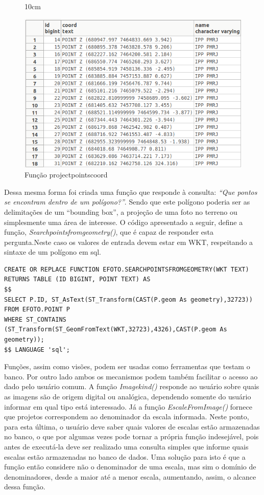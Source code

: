 \begin{figure}[!ht]{10cm}
  \caption{Função projectpointscoord} \label{fun1}
  \centering
  \includegraphics[width=1\hsize]{figuras/fun_ppr.png}
\end{figure}

Dessa mesma forma foi criada uma função que responde à consulta: \textit{``Que pontos se encontram dentro de um polígono?''}. Sendo que este polígono poderia ser as delimitações de um ``bounding box'', a projeção de uma foto no terreno ou simplesmente uma área de interesse. O código apresentado a seguir, define a função, \textit{Searchpointsfromgeometry()}, que é capaz de responder esta pergunta.Neste caso os valores de entrada devem estar em WKT, respeitando a sintaxe de um polígono em sql.

\begin{lstlisting}
CREATE OR REPLACE FUNCTION EFOTO.SEARCHPOINTSFROMGEOMETRY(WKT TEXT)
RETURNS TABLE (ID BIGINT, POINT TEXT) AS
$$
SELECT P.ID, ST_AsText(ST_Transform(CAST(P.geom As geometry),32723))
FROM EFOTO.POINT P
WHERE ST_CONTAINS (ST_Transform(ST_GeomFromText(WKT,32723),4326),CAST(P.geom As geometry));
$$ LANGUAGE 'sql';
\end{lstlisting}

Funções, assim como visões, podem ser usadas como ferramentas que testam o banco. Por outro lado ambos os mecanismos podem também facilitar o acesso ao dado pelo usuário comum. A função \textit{Imagekind()} responde ao usuário sobre quais as imagens são de origem digital ou analógica, dependendo somente do usuário informar em qual tipo está interessado. Já a função \textit{EscaleFromImage()} fornece que projetos correspondem ao denominador da escala informada. Neste ponto, para esta última, o usuário deve saber quais valores de escalas estão armazenadas no banco, o que por algumas vezes pode tornar a própria função indesejável, pois antes de executá-la deve ser realizado uma consulta simples que informe quais escalas estão armazenadas no banco de dados. Uma solução para isto é que a função então considere não o denominador de uma escala, mas sim o domínio de denominadores, desde a maior até a menor escala, aumentando, assim, o alcance dessa função.

